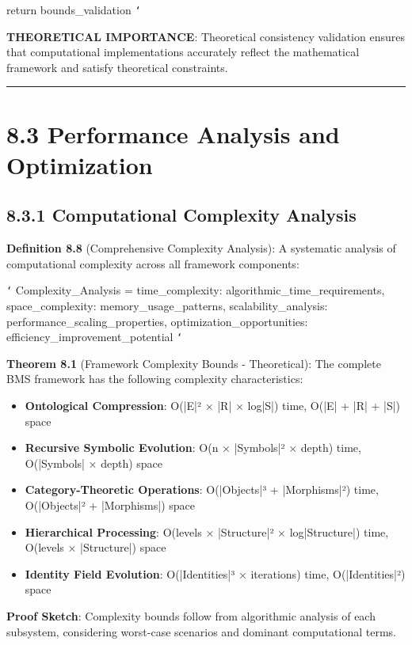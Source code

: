         return bounds_validation
\texttt{`}

\textbf{THEORETICAL IMPORTANCE}: Theoretical consistency validation ensures that computational implementations accurately reflect the mathematical framework and satisfy theoretical constraints.

\hrule

\section{8.3 Performance Analysis and Optimization}

\subsection{8.3.1 Computational Complexity Analysis}

\textbf{Definition 8.8} (Comprehensive Complexity Analysis): A systematic analysis of computational complexity across all framework components:

\texttt{`}
Complexity_Analysis = {
    time_complexity: algorithmic_time_requirements,
    space_complexity: memory_usage_patterns,
    scalability_analysis: performance_scaling_properties,
    optimization_opportunities: efficiency_improvement_potential
}
\texttt{`}

\textbf{Theorem 8.1} (Framework Complexity Bounds - Theoretical): The complete BMS framework has the following complexity characteristics:

\begin{itemize}
\item \textbf{Ontological Compression}: O(|E|² × |R| × log|S|) time, O(|E| + |R| + |S|) space
\item \textbf{Recursive Symbolic Evolution}: O(n × |Symbols|² × depth) time, O(|Symbols| × depth) space  
\item \textbf{Category-Theoretic Operations}: O(|Objects|³ + |Morphisms|²) time, O(|Objects|² + |Morphisms|) space
\item \textbf{Hierarchical Processing}: O(levels × |Structure|² × log|Structure|) time, O(levels × |Structure|) space
\item \textbf{Identity Field Evolution}: O(|Identities|³ × iterations) time, O(|Identities|²) space
\end{itemize}

\textbf{Proof Sketch}: Complexity bounds follow from algorithmic analysis of each subsystem, considering worst-case scenarios and dominant computational terms.

